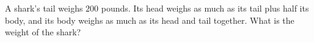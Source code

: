 A shark's tail weighs $200$ pounds. Its head weighs as much as its tail plus half its body, and its body weighs as much as its head and tail together. What is the weight of the shark?
